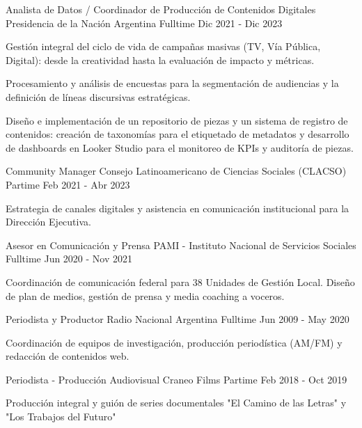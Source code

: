 \begin{cventries}
  \cventry%
    {Analista de Datos / Coordinador de Producción de Contenidos Digitales}%
    {Presidencia de la Nación Argentina}%
    {Fulltime}%
    {Dic 2021 - Dic 2023}%
    {%
      \begin{cvitems}
        \item {Gestión integral del ciclo de vida de campañas masivas (TV, Vía Pública, Digital): desde la creatividad hasta la evaluación de impacto y métricas.}
        \item {Procesamiento y análisis de encuestas para la segmentación de audiencias y la definición de líneas discursivas estratégicas.}
        \item {Diseño e implementación de un repositorio de piezas y un sistema de registro de contenidos: creación de taxonomías para el etiquetado de metadatos y desarrollo de dashboards en Looker Studio para el monitoreo de KPIs y auditoría de piezas.}
      \end{cvitems}%
    }

  \cventry%
    {Community Manager}%
    {Consejo Latinoamericano de Ciencias Sociales (CLACSO)}%
    {Partime}%
    {Feb 2021 - Abr 2023}%
    {%
      \begin{cvitems}
        \item {Estrategia de canales digitales y asistencia en comunicación institucional para la Dirección Ejecutiva.}
      \end{cvitems}%
    }

  \cventry%
    {Asesor en Comunicación y Prensa}%
    {PAMI - Instituto Nacional de Servicios Sociales}%
    {Fulltime}%
    {Jun 2020 - Nov 2021}%
    {%
      \begin{cvitems}
        \item {Coordinación de comunicación federal para 38 Unidades de Gestión Local. Diseño de plan de medios, gestión de prensa y media coaching a voceros.}
      \end{cvitems}%
    }

  \cventry%
    {Periodista y Productor}%
    {Radio Nacional Argentina}%
    {Fulltime}%
    {Jun 2009 - May 2020}%
    {%
      \begin{cvitems}
        \item {Coordinación de equipos de investigación, producción periodística (AM/FM) y redacción de contenidos web.}
      \end{cvitems}%
    }

  \cventry%
    {Periodista - Producción Audiovisual}%
    {Craneo Films}%
    {Partime}%
    {Feb 2018 - Oct 2019}%
    {%
      \begin{cvitems}
        \item {Producción integral y guión de series documentales "El Camino de las Letras" y "Los Trabajos del Futuro"}
      \end{cvitems}%
    }


\end{cventries}
